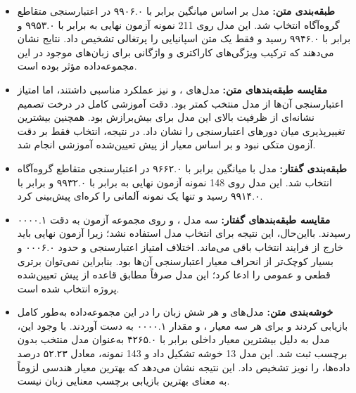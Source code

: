 \documentclass[12pt,a4paper,oneside]{report}
\begin{document}
\begin{itemize}
	\item \textbf{طبقه‌بندی متن:}
	مدل
	بر اساس میانگین
	برابر با ۹۹۰۶.۰ در اعتبارسنجی متقاطع گروه‌آگاه انتخاب شد. این مدل روی 211 نمونه آزمون نهایی به
	برابر با ۹۹۵۳.۰ و
	برابر با ۹۹۴۶.۰ رسید و فقط یک متن اسپانیایی را پرتغالی تشخیص داد. نتایج نشان می‌دهند که ترکیب ویژگی‌های کاراکتری و واژگانی برای زبان‌های موجود در این مجموعه‌داده مؤثر بوده است.

	\item \textbf{مقایسه طبقه‌بندهای متن:}
	مدل‌های
	،
	و
	نیز عملکرد مناسبی داشتند، اما امتیاز اعتبارسنجی آن‌ها از مدل منتخب کمتر بود. دقت آموزشی کامل در درخت تصمیم نشانه‌ای از ظرفیت بالای این مدل برای بیش‌برازش بود. همچنین
	بیشترین تغییرپذیری میان دورهای اعتبارسنجی را نشان داد. در نتیجه، انتخاب
	فقط بر دقت آزمون متکی نبود و بر اساس معیار از پیش تعیین‌شده آموزشی انجام شد.

	\item \textbf{طبقه‌بندی گفتار:}
	مدل
	با میانگین
	برابر با ۹۶۶۲.۰ در اعتبارسنجی متقاطع گروه‌آگاه انتخاب شد. این مدل روی 148 نمونه آزمون نهایی به
	برابر با ۹۹۳۲.۰ و
	برابر با ۹۹۱۴.۰ رسید و تنها یک نمونه آلمانی را کره‌ای پیش‌بینی کرد.

	\item \textbf{مقایسه طبقه‌بندهای گفتار:}
	سه مدل
	،
	و
	روی مجموعه آزمون به دقت ۰۰۰۰.۱ رسیدند. بااین‌حال، این نتیجه برای انتخاب مدل استفاده نشد؛ زیرا آزمون نهایی باید خارج از فرایند انتخاب باقی می‌ماند. اختلاف امتیاز اعتبارسنجی
	و
	حدود ۰۰۰۶.۰ و بسیار کوچک‌تر از انحراف معیار اعتبارسنجی آن‌ها بود. بنابراین نمی‌توان برتری قطعی و عمومی
	را ادعا کرد؛ این مدل صرفاً مطابق قاعده از پیش تعیین‌شده پروژه انتخاب شده است.

	\item \textbf{خوشه‌بندی متن:}
	مدل‌های
	و
	هر شش زبان را در این مجموعه‌داده به‌طور کامل بازیابی کردند و برای هر سه معیار
	،
	و
	مقدار ۰۰۰۰.۱ به دست آوردند. با وجود این، مدل
	به دلیل بیشترین معیار داخلی
	برابر با ۴۲۶۵.۰ به‌عنوان مدل منتخب بدون برچسب ثبت شد. این مدل 13 خوشه تشکیل داد و 143 نمونه، معادل ۵۲.۲۳ درصد داده‌ها، را نویز تشخیص داد. این نتیجه نشان می‌دهد که بهترین معیار هندسی لزوماً به معنای بهترین بازیابی برچسب معنایی زبان نیست.


\end{itemize}
\end{document}
